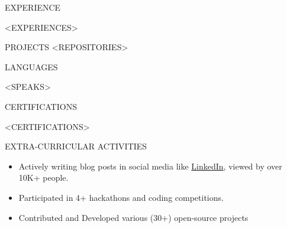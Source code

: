 \documentclass{resume}
\begin{document}
\begin{rSection}{EXPERIENCE}

<EXPERIENCES>
\end{rSection}

\vspace{1.5em}


\begin{rSection}{PROJECTS}    
    <REPOSITORIES>
\end{rSection}
\vspace{1.5em}


\begin{rSection}{LANGUAGES}

\begin{itemize}
    <SPEAKS>
\end{itemize}

\end{rSection}




\begin{rSection}{CERTIFICATIONS}

    \begin{itemize}
        <CERTIFICATIONS>
    \end{itemize}
    
    \end{rSection}
    


\begin{rSection}{EXTRA-CURRICULAR ACTIVITIES}

    \begin{itemize}
        \item Actively writing blog posts in social media like \href{https://www.linkedin.com/in/rahul-marban}{LinkedIn}, viewed by over 10K+ people.
        \item Participated in 4+ hackathons and coding competitions.
        \item Contributed and Developed various (30+) open-source projects
    \end{itemize}
    
    \end{rSection}
    
    \vspace{1.5em}

    
    
\end{document}
